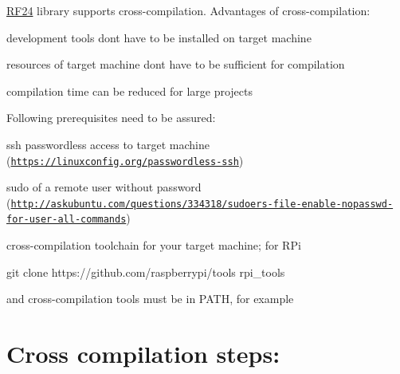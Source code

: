 \hyperlink{classRF24}{R\+F24} library supports cross-\/compilation. Advantages of cross-\/compilation\+:
\begin{DoxyItemize}
\item development tools don\textquotesingle{}t have to be installed on target machine
\item resources of target machine don\textquotesingle{}t have to be sufficient for compilation
\item compilation time can be reduced for large projects
\end{DoxyItemize}

Following prerequisites need to be assured\+:
\begin{DoxyItemize}
\item ssh passwordless access to target machine (\href{https://linuxconfig.org/passwordless-ssh}{\tt https\+://linuxconfig.\+org/passwordless-\/ssh})
\item sudo of a remote user without password (\href{http://askubuntu.com/questions/334318/sudoers-file-enable-nopasswd-for-user-all-commands}{\tt http\+://askubuntu.\+com/questions/334318/sudoers-\/file-\/enable-\/nopasswd-\/for-\/user-\/all-\/commands})
\item cross-\/compilation toolchain for your target machine; for R\+Pi 
\begin{DoxyCode}
git clone https:\textcolor{comment}{//github.com/raspberrypi/tools rpi\_tools }
\end{DoxyCode}
 and cross-\/compilation tools must be in P\+A\+TH, for example 

\end{DoxyItemize}\hypertarget{CrossCompile_CxSteps}{}\section{Cross compilation steps\+:}\label{CrossCompile_CxSteps}

